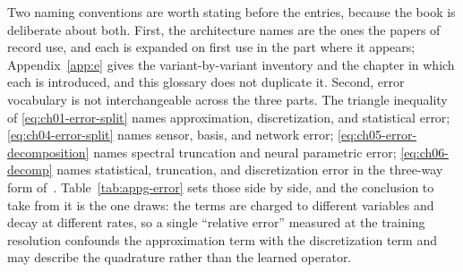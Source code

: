 Two naming conventions are worth stating before the entries, because the book is
deliberate about both. First, the architecture names are the ones the papers of
record use, and each is expanded on first use in the part where it appears;
Appendix~\ref{app:e} gives the variant-by-variant inventory and
the chapter in which each is introduced, and this glossary does not duplicate it.
Second, error vocabulary is not interchangeable across the three parts. The
triangle inequality of \eqref{eq:ch01-error-split} names approximation,
discretization, and statistical error; \eqref{eq:ch04-error-split} names sensor,
basis, and network error; \eqref{eq:ch05-error-decomposition} names spectral
truncation and neural parametric error; \eqref{eq:ch06-decomp} names statistical,
truncation, and discretization error in the three-way form
of~\cite{subedi2024controlling}. Table~\ref{tab:appg-error} sets those side by
side, and the conclusion to take from it is the one 
draws: the terms are charged to different variables and decay at different rates,
so a single ``relative error'' measured at the training resolution confounds the
approximation term with the discretization term and may describe the quadrature
rather than the learned operator.

